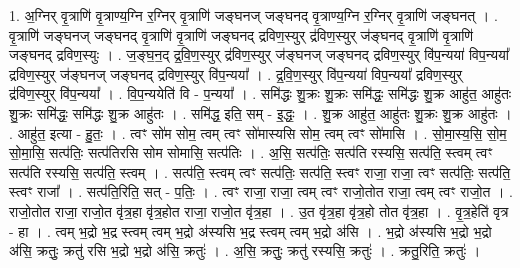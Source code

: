 \documentclass[17pt]{extarticle}
\begin{document}
1. अ॒ग्निर् वृ॒त्राणि॑ वृ॒त्राण्य॒ग्नि र॒ग्निर् वृ॒त्राणि॑ जङ्घनज् जङ्घनद् वृ॒त्राण्य॒ग्नि र॒ग्निर् वृ॒त्राणि॑ जङ्घनत् । . वृ॒त्राणि॑ जङ्घनज् जङ्घनद् वृ॒त्राणि॑ वृ॒त्राणि॑ जङ्घनद् द्रविण॒स्युर् द्र॑विण॒स्युर् ज॑ङ्घनद् वृ॒त्राणि॑ वृ॒त्राणि॑ जङ्घनद् द्रविण॒स्युः । . ज॒ङ्घ॒न॒द् द्र॒वि॒ण॒स्युर् द्र॑विण॒स्युर् ज॑ङ्घनज् जङ्घनद् द्रविण॒स्युर् वि॑प॒न्यया॑ विप॒न्यया᳚ द्रविण॒स्युर् ज॑ङ्घनज् जङ्घनद् द्रविण॒स्युर् वि॑प॒न्यया᳚ । . द्र॒वि॒ण॒स्युर् वि॑प॒न्यया॑ विप॒न्यया᳚ द्रविण॒स्युर् द्र॑विण॒स्युर् वि॑प॒न्यया᳚ । . वि॒प॒न्ययेति॑ वि - प॒न्यया᳚ । . समि॑द्धः शु॒क्रः शु॒क्रः समि॑द्धः॒ समि॑द्धः शु॒क्र आहु॑त॒ आहु॑तः शु॒क्रः समि॑द्धः॒ समि॑द्धः शु॒क्र आहु॑तः । . समि॑द्ध॒ इति॒ सम् - इ॒द्धः॒ । . शु॒क्र आहु॑त॒ आहु॑तः शु॒क्रः शु॒क्र आहु॑तः । . आहु॑त॒ इत्या - हु॒तः॒ । . त्वꣳ सो॑म सोम॒ त्वम् त्वꣳ सो॑मास्यसि सोम॒ त्वम् त्वꣳ सो॑मासि । . सो॒मा॒स्य॒सि॒ सो॒म॒ सो॒मा॒सि॒ सत्प॑तिः॒ सत्प॑तिरसि सोम सोमासि॒ सत्प॑तिः । . अ॒सि॒ सत्प॑तिः॒ सत्प॑ति रस्यसि॒ सत्प॑ति॒ स्त्वम् त्वꣳ सत्प॑ति रस्यसि॒ सत्प॑ति॒ स्त्वम् । . सत्प॑ति॒ स्त्वम् त्वꣳ सत्प॑तिः॒ सत्प॑ति॒ स्त्वꣳ राजा॒ राजा॒ त्वꣳ सत्प॑तिः॒ सत्प॑ति॒ स्त्वꣳ राजा᳚ । . सत्प॑ति॒रिति॒ सत् - प॒तिः॒ । . त्वꣳ राजा॒ राजा॒ त्वम् त्वꣳ राजो॒तोत राजा॒ त्वम् त्वꣳ राजो॒त । . राजो॒तोत राजा॒ राजो॒त वृ॑त्र॒हा वृ॑त्र॒होत राजा॒ राजो॒त वृ॑त्र॒हा । . उ॒त वृ॑त्र॒हा वृ॑त्र॒हो तोत वृ॑त्र॒हा । . वृ॒त्र॒हेति॑ वृत्र - हा । . त्वम् भ॒द्रो भ॒द्र स्त्वम् त्वम् भ॒द्रो अ॑स्यसि भ॒द्र स्त्वम् त्वम् भ॒द्रो अ॑सि । . भ॒द्रो अ॑स्यसि भ॒द्रो भ॒द्रो अ॑सि॒ क्रतुः॒ क्रतु॑ रसि भ॒द्रो भ॒द्रो अ॑सि॒ क्रतुः॑ । . अ॒सि॒ क्रतुः॒ क्रतु॑ रस्यसि॒ क्रतुः॑ । . क्रतु॒रिति॒ क्रतुः॑ । \newline
\end{document}
